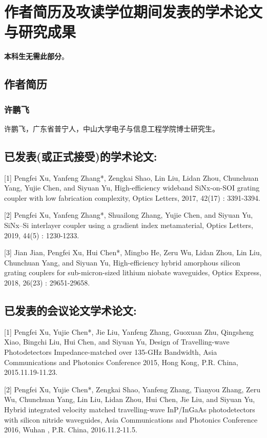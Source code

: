 \chapter{作者简历及攻读学位期间发表的学术论文与研究成果}

\textbf{本科生无需此部分}。

\section*{作者简历}

\subsection*{许鹏飞}

许鹏飞，广东省普宁人，中山大学电子与信息工程学院博士研究生。

\section*{已发表(或正式接受)的学术论文:}

[1] Pengfei Xu, Yanfeng Zhang*, Zengkai Shao, Lin Liu, Lidan Zhou, Chunchuan Yang, Yujie Chen, and Siyuan Yu, High-efficiency wideband SiNx-on-SOI grating coupler with low fabrication complexity, Optics Letters, 2017, 42(17) : 3391-3394.

[2] Pengfei Xu, Yanfeng Zhang*, Shuailong Zhang, Yujie Chen, and Siyuan Yu, SiNx–Si interlayer coupler using a gradient index metamaterial, Optics Letters, 2019, 44(5) : 1230-1233.

[3] Jian Jian, Pengfei Xu, Hui Chen*, Mingbo He, Zeru Wu, Lidan Zhou, Lin Liu, Chunchuan Yang, and Siyuan Yu, High-efficiency hybrid amorphous silicon grating couplers for sub-micron-sized lithium niobate waveguides, Optics Express, 2018, 26(23) : 29651-29658.

\section*{已发表的会议论文学术论文:}

[1] Pengfei Xu, Yujie Chen*, Jie Liu, Yanfeng Zhang, Guoxuan Zhu, Qingsheng Xiao, Bingchi Liu, Hui Chen, and Siyuan Yu, Design of Travelling-wave Photodetectors Impedance-matched over 135-GHz Bandwidth, Asia Communications and Photonics Conference 2015, Hong Kong, P.R. China, 2015.11.19-11.23.

[2] Pengfei Xu, Yujie Chen*, Zengkai Shao, Yanfeng Zhang, Tianyou Zhang, Zeru Wu, Chunchuan Yang, Lin Liu, Lidan Zhou, Hui Chen, Jie Liu, and Siyuan Yu, Hybrid integrated velocity matched travelling-wave InP/InGaAs photodetectors with silicon nitride waveguides, Asia Communications and Photonics Conference 2016, Wuhan , P.R. China, 2016.11.2-11.5.

